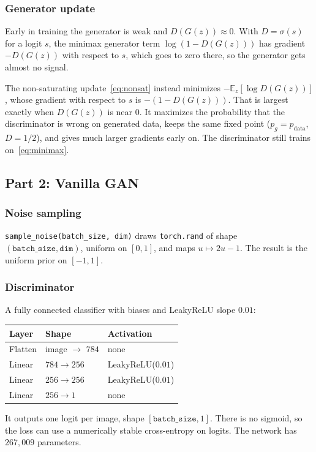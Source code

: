 \subsubsection{Generator update}

Early in training the generator is weak and \(D(G(z)) \approx 0\). With \(D = \sigma(s)\) for a logit \(s\), the minimax generator term \(\log(1-D(G(z)))\) has gradient \(-D(G(z))\) with respect to \(s\), which goes to zero there, so the generator gets almost no signal.

The non-saturating update~\eqref{eq:nonsat} instead minimizes \(-\mathbb{E}_z[\log D(G(z))]\), whose gradient with respect to \(s\) is \(-(1 - D(G(z)))\). That is largest exactly when \(D(G(z))\) is near \(0\). It maximizes the probability that the discriminator is wrong on generated data, keeps the same fixed point (\(p_g = p_{\mathrm{data}}\), \(D = 1/2\)), and gives much larger gradients early on. The discriminator still trains on~\eqref{eq:minimax}.

\subsection{Part 2: Vanilla GAN}

\subsubsection{Noise sampling}

\texttt{sample\_noise(batch\_size, dim)} draws \texttt{torch.rand} of shape \((\texttt{batch\_size}, \texttt{dim})\), uniform on \([0,1]\), and maps \(u \mapsto 2u-1\). The result is the uniform prior on \([-1,1]\).

\subsubsection{Discriminator}

A fully connected classifier with biases and LeakyReLU slope \(0.01\):
\begin{center}
\begin{tabular}{lll}
\toprule
Layer & Shape & Activation \\
\midrule
Flatten & image \(\to\) \(784\) & none \\
Linear & \(784 \to 256\) & LeakyReLU(\(0.01\)) \\
Linear & \(256 \to 256\) & LeakyReLU(\(0.01\)) \\
Linear & \(256 \to 1\) & none \\
\bottomrule
\end{tabular}
\end{center}
It outputs one logit per image, shape \([\texttt{batch\_size}, 1]\). There is no sigmoid, so the loss can use a numerically stable cross-entropy on logits. The network has \(267{,}009\) parameters.

